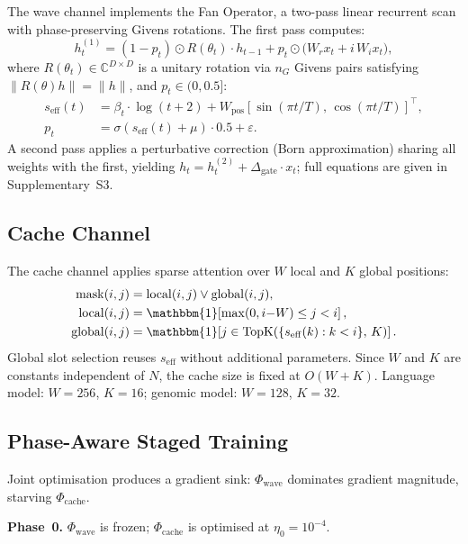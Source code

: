 \documentclass{article}
\begin{document}
The wave channel implements the Fan Operator, a two-pass linear recurrent
scan with phase-preserving Givens rotations.
The first pass computes:
\begin{equation}
  h_t^{(1)} = (1 - p_t) \odot R(\theta_t) \cdot h_{t-1}
              + p_t \odot \bigl(W_r x_t + i\, W_i x_t\bigr),
\end{equation}
where $R(\theta_t) \in \mathbb{C}^{D \times D}$ is a unitary rotation
via $n_G$ Givens pairs satisfying $\|R(\theta)h\| = \|h\|$, and
$p_t \in (0, 0.5]$:
\begin{align}
  s_\mathrm{eff}(t) &= \beta_t \cdot \log(t+2)
    + W_\mathrm{pos}[\sin(\pi t/T),\, \cos(\pi t/T)]^\top, \\
  p_t &= \sigma\!\left(s_\mathrm{eff}(t) + \mu\right) \cdot 0.5
         + \varepsilon.
\end{align}
A second pass applies a perturbative correction (Born approximation)
sharing all weights with the first, yielding $h_t = h_t^{(2)} + \Delta_\mathrm{gate} \cdot x_t$;
full equations are given in Supplementary~S3.

\subsection{Cache Channel}

The cache channel applies sparse attention over $W$ local and $K$ global
positions:
\begin{align}
  \mathrm{mask}(i,j) &= \mathrm{local}(i,j) \vee \mathrm{global}(i,j),\\
  \mathrm{local}(i,j)
    &= \mathbbm{1}\!\left[\max(0,i{-}W) \le j < i\right], \\
  \mathrm{global}(i,j)
    &= \mathbbm{1}\!\left[j \in
       \mathrm{TopK}(\{s_\mathrm{eff}(k) : k < i\},\, K)\right].
\end{align}
Global slot selection reuses $s_\mathrm{eff}$ without additional
parameters.
Since $W$ and $K$ are constants independent of $N$, the cache size is
fixed at $O(W{+}K)$.
Language model: $W = 256$, $K = 16$; genomic model: $W = 128$, $K = 32$.

\subsection{Phase-Aware Staged Training}

Joint optimisation produces a gradient sink: $\Phi_\mathrm{wave}$
dominates gradient magnitude, starving $\Phi_\mathrm{cache}$.

\textbf{Phase~0.}
$\Phi_\mathrm{wave}$ is frozen; $\Phi_\mathrm{cache}$ is optimised at
$\eta_0 = 10^{-4}$.
\end{document}
